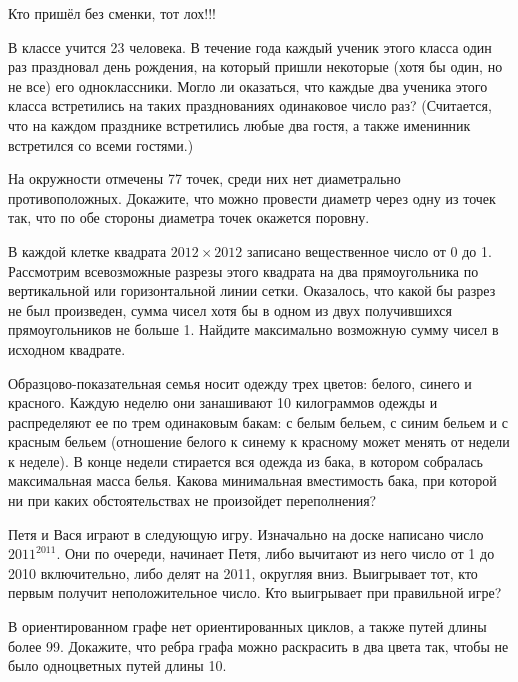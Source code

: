 \begin{flushright}
        \scriptsize{Кто пришёл без сменки, тот лох!!!}
\end{flushright}

В классе учится 23 человека. В течение года каждый ученик этого класса один раз праздновал день рождения, на который пришли некоторые (хотя бы один, но не все) его одноклассники. Могло ли оказаться, что каждые два ученика этого класса встретились на таких празднованиях одинаковое число раз? (Считается, что на каждом празднике встретились любые два гостя, а также именинник встретился со всеми гостями.)


На окружности отмечены 77 точек, среди них нет диаметрально противоположных. Докажите, что можно провести диаметр через одну из точек так, что по обе стороны диаметра точек окажется поровну.

В каждой клетке квадрата $2012 \times 2012$ записано вещественное число от 0 до 1. Рассмотрим всевозможные разрезы этого квадрата на два прямоугольника по вертикальной или горизонтальной линии сетки. Оказалось, что какой бы разрез не был произведен, сумма чисел хотя бы в одном из двух получившихся прямоугольников не больше 1. Найдите максимально возможную сумму чисел в исходном квадрате.

Образцово-показательная семья носит одежду трех цветов: белого, синего и красного. Каждую неделю они занашивают 10 килограммов одежды и распределяют ее по трем одинаковым бакам: с белым бельем, с синим бельем и с красным бельем (отношение белого к синему к красному может менять от недели к неделе). В конце недели стирается вся одежда из бака, в котором собралась максимальная масса белья. Какова минимальная вместимость бака, при которой ни при каких обстоятельствах не произойдет переполнения?

Петя и Вася играют в следующую игру. Изначально на доске написано число $2011^{2011}$. Они по очереди, начинает Петя, либо вычитают из него число от 1 до 2010 включительно, либо делят на 2011, округляя вниз. Выигрывает тот, кто первым получит неположительное число. Кто выигрывает при правильной игре?

В ориентированном графе нет ориентированных циклов, а также путей длины более 99. Докажите, что ребра графа можно раскрасить в два цвета так, чтобы не было одноцветных путей длины 10.